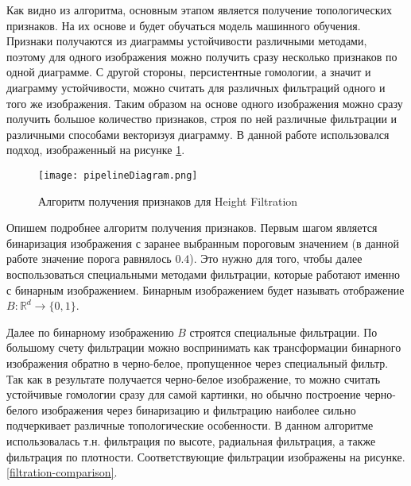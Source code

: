 Как видно из алгоритма, основным этапом является получение топологических признаков. На их основе и будет обучаться модель машинного обучения. Признаки получаются из диаграммы устойчивости различными методами, поэтому для одного изображения можно получить сразу несколько признаков по одной диаграмме. С другой стороны, персистентные гомологии, а значит и диаграмму устойчивости, можно считать для различных фильтраций одного и того же изображения. Таким образом на основе одного изображения можно сразу получить большое количество признаков, строя по ней различные фильтрации и различными способами векторизуя диаграмму. В данной работе использовался подход, изображенный на рисунке \ref{pipeline}.

\begin{figure}[!htbp]
	\begin{center}
		\texttt{[image: pipelineDiagram.png]}\\
		\caption{Алгоритм получения признаков для Height Filtration}
		\label{pipeline}
	\end{center}
\end{figure}

Опишем подробнее алгоритм получения признаков. Первым шагом является бинаризация изображения с заранее выбранным пороговым значением (в данной работе значение порога равнялось $0.4$). Это нужно для того, чтобы далее воспользоваться специальными методами фильтрации, которые работают именно с бинарным изображением. Бинарным изображением будет называть отображение $B: \mathbb{R}^d \to \{0, 1\}$.

Далее по бинарному изображению $B$ строятся специальные фильтрации. По большому счету фильтрации можно воспринимать как трансформации бинарного изображения обратно в черно-белое, пропущенное через специальный фильтр. Так как в результате получается черно-белое изображение, то можно считать устойчивые гомологии сразу для самой картинки, но обычно построение черно-белого изображения через бинаризацию и фильтрацию наиболее сильно подчеркивает различные топологические особенности. В данном алгоритме использовалась т.н. фильтрация по высоте, радиальная фильтрация, а также фильтрация по плотности. Соответствующие фильтрации изображены на рисунке. \ref{filtration-comparison}.


